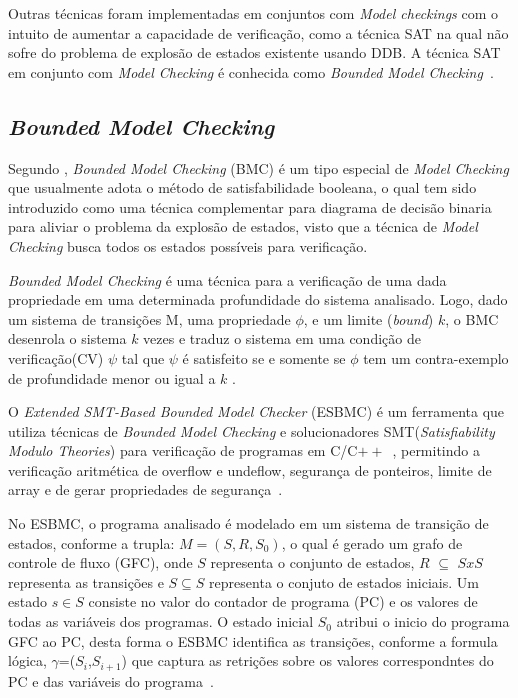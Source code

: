 \par
Outras técnicas foram implementadas em conjuntos com \textit{Model checkings} com o intuito de aumentar a capacidade de verificação, como a técnica SAT na qual não sofre do problema de explosão de estados existente usando DDB. A técnica SAT em conjunto com \textit{Model Checking} é conhecida como \textit{Bounded Model Checking}~\cite{biere2003bounded}.

\subsection{\label{cap:bounded}\textit{Bounded Model Checking}}
Segundo , \textit{Bounded Model Checking} (BMC) é um tipo especial de \textit{Model Checking} que usualmente adota o método de satisfabilidade booleana, o qual tem sido introduzido como uma técnica complementar para diagrama de decisão binaria para aliviar o problema da explosão de estados, visto que a técnica de \textit{Model Checking} busca todos os estados possíveis para verificação.

\par
\textit{Bounded Model Checking} é uma técnica para a verificação de uma dada propriedade em uma determinada profundidade do sistema analisado. Logo, dado um sistema de transições M, uma propriedade $\phi$, e um limite (\textit{bound}) $k$, o BMC desenrola o sistema $k$ vezes e traduz o sistema em uma condição de verificação(CV) $\psi$ tal que $\psi$ é satisfeito se e somente se $\phi$ tem um contra-exemplo de profundidade menor ou igual a $k$ \cite{rocha2015verificaccao}.

\par
O \textit{Extended SMT-Based Bounded Model Checker} (ESBMC) é um ferramenta que utiliza técnicas de \textit{Bounded Model Checking} e solucionadores SMT(\textit{Satisfiability Modulo Theories}) para verificação de programas em C/C$++$~\cite{rocha2015model}, permitindo a verificação aritmética de overflow e undeflow, segurança de ponteiros, limite de array e de gerar propriedades de segurança~\cite{cordeiro2012smt,rocha2015verificaccao}. 

\par
No ESBMC, o programa analisado é modelado em um sistema de transição de estados, conforme a trupla: $M=(S,R,S_{0})$, o qual é gerado um grafo de controle de fluxo (GFC), onde $S$ representa o conjunto de estados, $R$ $\subseteq$ $SxS$ representa as transições e $S \subseteq S$ representa o conjuto de estados iniciais. Um estado $s \in S$ consiste no valor do contador de programa (PC) e os valores de todas as variáveis dos programas. O estado inicial $S_{0}$ atribui o inicio do programa GFC ao PC, desta forma o ESBMC identifica as transições, conforme a formula lógica, $\gamma$=($S_{i}$,$S_{i+1}$) que captura as retrições sobre os valores correspondntes do PC e das variáveis do programa~\cite{cordeiro2012smt}.

